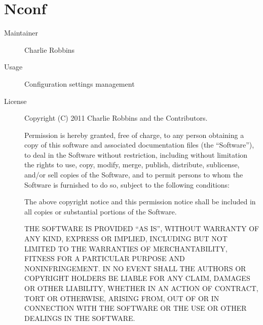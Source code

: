   \section*{Nconf}
    \begin{description}
      \item[Maintainer] Charlie Robbins
      \item[Usage] Configuration settings management
      \item[License] \scriptsize Copyright (C) 2011 Charlie Robbins and the Contributors.

        Permission is hereby granted, free of charge, to any person obtaining a copy
        of this software and associated documentation files (the ``Software''), to deal
        in the Software without restriction, including without limitation the rights
        to use, copy, modify, merge, publish, distribute, sublicense, and/or sell
        copies of the Software, and to permit persons to whom the Software is
        furnished to do so, subject to the following conditions:

        The above copyright notice and this permission notice shall be included in
        all copies or substantial portions of the Software.

        THE SOFTWARE IS PROVIDED ``AS IS'', WITHOUT WARRANTY OF ANY KIND, EXPRESS OR
        IMPLIED, INCLUDING BUT NOT LIMITED TO THE WARRANTIES OF MERCHANTABILITY,
        FITNESS FOR A PARTICULAR PURPOSE AND NONINFRINGEMENT. IN NO EVENT SHALL THE
        AUTHORS OR COPYRIGHT HOLDERS BE LIABLE FOR ANY CLAIM, DAMAGES OR OTHER
        LIABILITY, WHETHER IN AN ACTION OF CONTRACT, TORT OR OTHERWISE, ARISING FROM,
        OUT OF OR IN CONNECTION WITH THE SOFTWARE OR THE USE OR OTHER DEALINGS IN
        THE SOFTWARE.
    \end{description}

